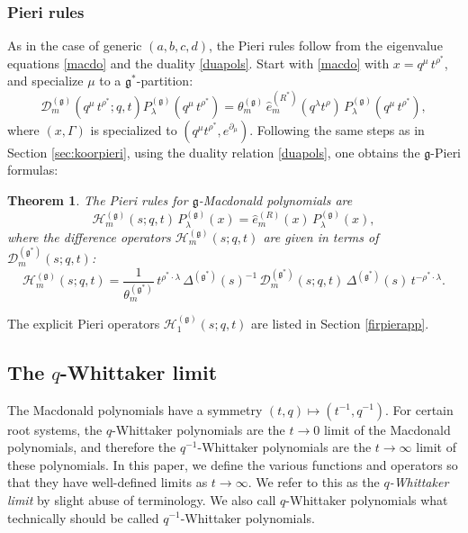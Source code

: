 \documentclass[12pt]{amsart}
\newtheorem{thm}{Theorem}[section]
\newcommand{\g}{{\mathfrak{g}}}
\newcommand{\D}{{\mathcal{D}}}
\newcommand{\cH}{{\mathcal{H}}}
\numberwithin{equation}{section}
\begin{document}
\subsubsection{Pieri rules}
\label{sec:macdopieri}
As in the case of generic $(a,b,c,d)$, the Pieri rules follow from the eigenvalue equations \eqref{macdo} and the duality \eqref{duapols}. Start with \eqref{macdo} with $x=q^\mu\,t^{\rho^*}$, and specialize $\mu$ to a $\g^*$-partition:
\begin{equation}\label{Hmacdo}
{\mathcal D}_m^{(\g)}(q^\mu\,t^{\rho^*};q,t) P_\lambda^{(\g)}(q^\mu\,t^{\rho^*})=\theta_m^{(\g)}\, {\hat e}_m^{(R^*)}(q^\lambda t^\rho) \, P_\lambda^{(\g)}(q^\mu\,t^{\rho^*}),
\end{equation}
where $(x,\Gamma)$ is specialized to $(q^\mu t^{\rho^*},e^{\partial_\mu})$.
Following the same steps as in Section \ref{sec:koorpieri}, using the duality relation \eqref{duapols}, one obtains the $\g$-Pieri formulas:
\begin{thm}\label{mactopieri}
The Pieri rules for $\g$-Macdonald polynomials are
\begin{equation}
\cH_m^{(\g)}(s;q,t) \, P_\lambda^{(\g)}(x)= {\hat e}_m^{(R)}(x)\, P_\lambda^{(\g)}(x),
\label{PieriG}
\end{equation}
where the difference operators $\cH_m^{(\g)}(s;q,t)$ are given in terms of $\D^{(\g^*)}_m(s;q,t)$:
\begin{equation}
\cH_m^{(\g)}(s;q,t)=\frac{1}{\theta_m^{(\g^*)}}\, t^{\rho^*\cdot\lambda} \, \Delta^{(\g^*)}(s)^{-1}\, {\mathcal D}_m^{(\g^*)}(s;q,t)\, \Delta^{(\g^*)}(s) \,t^{-\rho^*\cdot\lambda} .
\label{PieriOpG}
\end{equation}
%
\end{thm}
The explicit Pieri operators $\cH_1^{(\g)}(s;q,t)$ are listed in Section \ref{firpierapp}.


\subsection{The $q$-Whittaker limit}
\label{sec:qwhittak}
The Macdonald polynomials have a symmetry $(t,q)\mapsto (t^{-1},q^{-1})$. For certain root systems, the $q$-Whittaker polynomials are the $t\to 0$ limit of the Macdonald polynomials, and therefore the $q^{-1}$-Whittaker polynomials are the $t\to\infty$ limit of these polynomials. In this paper, we define the various functions and operators so that they have well-defined limits as $t\to\infty$. We refer to this as the {\it $q$-Whittaker limit} by slight abuse of terminology. We also call $q$-Whittaker polynomials what technically should be called $q^{-1}$-Whittaker polynomials.
\end{document}
